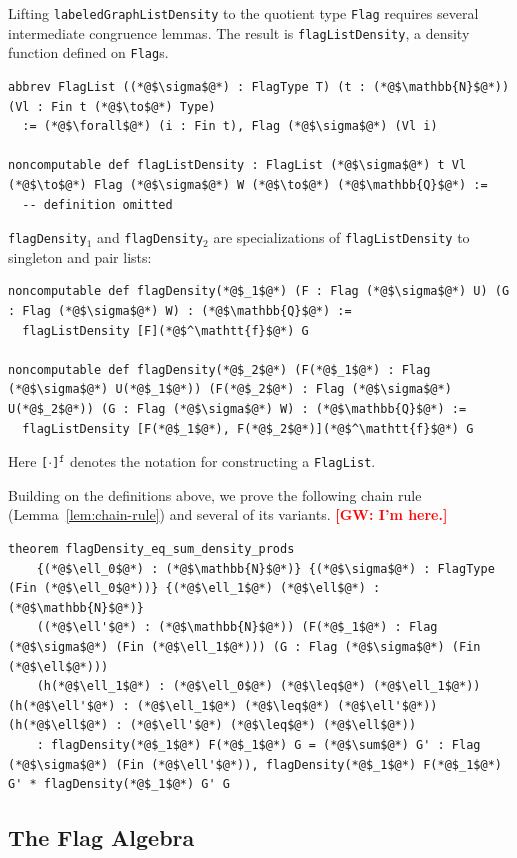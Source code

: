 \documentclass{article}
\newcommand{\lean}[1]{\texttt{#1}}
\newcommand{\gw}[1]{\textcolor{red}{\textbf{[GW: #1]}}}
\begin{document}
Lifting \lean{labeledGraphListDensity} to the quotient type \lean{Flag} requires
several intermediate congruence lemmas.  The result is \lean{flagListDensity},
a density function defined on \lean{Flag}s.
\begin{lstlisting}
abbrev FlagList ((*@$\sigma$@*) : FlagType T) (t : (*@$\mathbb{N}$@*)) (Vl : Fin t (*@$\to$@*) Type)
  := (*@$\forall$@*) (i : Fin t), Flag (*@$\sigma$@*) (Vl i)

noncomputable def flagListDensity : FlagList (*@$\sigma$@*) t Vl (*@$\to$@*) Flag (*@$\sigma$@*) W (*@$\to$@*) (*@$\mathbb{Q}$@*) :=
  -- definition omitted
\end{lstlisting}
\lean{flagDensity}$_1$ and \lean{flagDensity}$_2$ are specializations of \lean{flagListDensity}
to singleton and pair lists:
\begin{lstlisting}
noncomputable def flagDensity(*@$_1$@*) (F : Flag (*@$\sigma$@*) U) (G : Flag (*@$\sigma$@*) W) : (*@$\mathbb{Q}$@*) :=
  flagListDensity [F](*@$^\mathtt{f}$@*) G

noncomputable def flagDensity(*@$_2$@*) (F(*@$_1$@*) : Flag (*@$\sigma$@*) U(*@$_1$@*)) (F(*@$_2$@*) : Flag (*@$\sigma$@*) U(*@$_2$@*)) (G : Flag (*@$\sigma$@*) W) : (*@$\mathbb{Q}$@*) :=
  flagListDensity [F(*@$_1$@*), F(*@$_2$@*)](*@$^\mathtt{f}$@*) G
\end{lstlisting}
Here \lean{[}$\cdot$\lean{]}$^{\mathtt{f}}$ denotes the notation for constructing a \lean{FlagList}.

Building on the definitions above, we prove the following chain rule (Lemma~\ref{lem:chain-rule}) and several of its variants. \gw{I'm here.}
\begin{lstlisting}
theorem flagDensity_eq_sum_density_prods
    {(*@$\ell_0$@*) : (*@$\mathbb{N}$@*)} {(*@$\sigma$@*) : FlagType (Fin (*@$\ell_0$@*))} {(*@$\ell_1$@*) (*@$\ell$@*) : (*@$\mathbb{N}$@*)}
    ((*@$\ell'$@*) : (*@$\mathbb{N}$@*)) (F(*@$_1$@*) : Flag (*@$\sigma$@*) (Fin (*@$\ell_1$@*))) (G : Flag (*@$\sigma$@*) (Fin (*@$\ell$@*)))
    (h(*@$\ell_1$@*) : (*@$\ell_0$@*) (*@$\leq$@*) (*@$\ell_1$@*)) (h(*@$\ell'$@*) : (*@$\ell_1$@*) (*@$\leq$@*) (*@$\ell'$@*)) (h(*@$\ell$@*) : (*@$\ell'$@*) (*@$\leq$@*) (*@$\ell$@*))
    : flagDensity(*@$_1$@*) F(*@$_1$@*) G = (*@$\sum$@*) G' : Flag (*@$\sigma$@*) (Fin (*@$\ell'$@*)), flagDensity(*@$_1$@*) F(*@$_1$@*) G' * flagDensity(*@$_1$@*) G' G
\end{lstlisting}

\subsection{The Flag Algebra}
\end{document}
